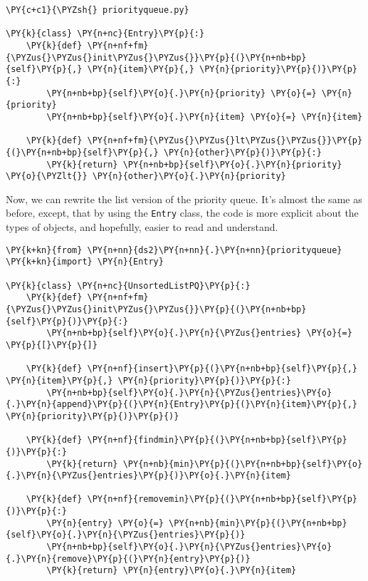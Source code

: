 \begin{Verbatim}[commandchars=\\\{\}]
\PY{c+c1}{\PYZsh{} priorityqueue.py}

\PY{k}{class} \PY{n+nc}{Entry}\PY{p}{:}
    \PY{k}{def} \PY{n+nf+fm}{\PYZus{}\PYZus{}init\PYZus{}\PYZus{}}\PY{p}{(}\PY{n+nb+bp}{self}\PY{p}{,} \PY{n}{item}\PY{p}{,} \PY{n}{priority}\PY{p}{)}\PY{p}{:}
        \PY{n+nb+bp}{self}\PY{o}{.}\PY{n}{priority} \PY{o}{=} \PY{n}{priority}
        \PY{n+nb+bp}{self}\PY{o}{.}\PY{n}{item} \PY{o}{=} \PY{n}{item}

    \PY{k}{def} \PY{n+nf+fm}{\PYZus{}\PYZus{}lt\PYZus{}\PYZus{}}\PY{p}{(}\PY{n+nb+bp}{self}\PY{p}{,} \PY{n}{other}\PY{p}{)}\PY{p}{:}
        \PY{k}{return} \PY{n+nb+bp}{self}\PY{o}{.}\PY{n}{priority} \PY{o}{\PYZlt{}} \PY{n}{other}\PY{o}{.}\PY{n}{priority}
\end{Verbatim}



Now, we can rewrite the list version of the priority queue.  It's almost the same as before, except, that by using the \texttt{Entry} class, the code is more explicit about the types of objects, and hopefully, easier to read and understand.

\begin{Verbatim}[commandchars=\\\{\}]
\PY{k+kn}{from} \PY{n+nn}{ds2}\PY{n+nn}{.}\PY{n+nn}{priorityqueue} \PY{k+kn}{import} \PY{n}{Entry}

\PY{k}{class} \PY{n+nc}{UnsortedListPQ}\PY{p}{:}
    \PY{k}{def} \PY{n+nf+fm}{\PYZus{}\PYZus{}init\PYZus{}\PYZus{}}\PY{p}{(}\PY{n+nb+bp}{self}\PY{p}{)}\PY{p}{:}
        \PY{n+nb+bp}{self}\PY{o}{.}\PY{n}{\PYZus{}entries} \PY{o}{=} \PY{p}{[}\PY{p}{]}

    \PY{k}{def} \PY{n+nf}{insert}\PY{p}{(}\PY{n+nb+bp}{self}\PY{p}{,} \PY{n}{item}\PY{p}{,} \PY{n}{priority}\PY{p}{)}\PY{p}{:}
        \PY{n+nb+bp}{self}\PY{o}{.}\PY{n}{\PYZus{}entries}\PY{o}{.}\PY{n}{append}\PY{p}{(}\PY{n}{Entry}\PY{p}{(}\PY{n}{item}\PY{p}{,} \PY{n}{priority}\PY{p}{)}\PY{p}{)}

    \PY{k}{def} \PY{n+nf}{findmin}\PY{p}{(}\PY{n+nb+bp}{self}\PY{p}{)}\PY{p}{:}
        \PY{k}{return} \PY{n+nb}{min}\PY{p}{(}\PY{n+nb+bp}{self}\PY{o}{.}\PY{n}{\PYZus{}entries}\PY{p}{)}\PY{o}{.}\PY{n}{item}

    \PY{k}{def} \PY{n+nf}{removemin}\PY{p}{(}\PY{n+nb+bp}{self}\PY{p}{)}\PY{p}{:}
        \PY{n}{entry} \PY{o}{=} \PY{n+nb}{min}\PY{p}{(}\PY{n+nb+bp}{self}\PY{o}{.}\PY{n}{\PYZus{}entries}\PY{p}{)}
        \PY{n+nb+bp}{self}\PY{o}{.}\PY{n}{\PYZus{}entries}\PY{o}{.}\PY{n}{remove}\PY{p}{(}\PY{n}{entry}\PY{p}{)}
        \PY{k}{return} \PY{n}{entry}\PY{o}{.}\PY{n}{item}
\end{Verbatim}



